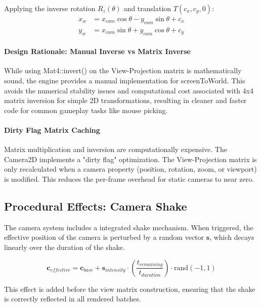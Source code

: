 Applying the inverse rotation $R_z(\theta)$ and translation $T(c_x, c_y, 0)$:
\begin{align}
x_w &= x_{cam} \cos \theta - y_{cam} \sin \theta + c_x \\
y_w &= x_{cam} \sin \theta + y_{cam} \cos \theta + c_y
\end{align}


\paragraph{Design Rationale: Manual Inverse vs Matrix Inverse}

While using Mat4::invert() on the View-Projection matrix is mathematically sound, the engine provides a manual implementation for screenToWorld. This avoids the numerical stability issues and computational cost associated with 4x4 matrix inversion for simple 2D transformations, resulting in cleaner and faster code for common gameplay tasks like mouse picking.




\paragraph{Dirty Flag Matrix Caching}

Matrix multiplication and inversion are computationally expensive. The Camera2D implements a "dirty flag" optimization. The View-Projection matrix is only recalculated when a camera property (position, rotation, zoom, or viewport) is modified. This reduces the per-frame overhead for static cameras to near zero.



\subsection{Procedural Effects: Camera Shake}

The camera system includes a integrated shake mechanism. When triggered, the effective position of the camera is perturbed by a random vector $\mathbf{s}$, which decays linearly over the duration of the shake.

\begin{equation}
\mathbf{c}_{effective} = \mathbf{c}_{base} + \mathbf{s}_{intensity} \cdot \left(\frac{t_{remaining}}{t_{duration}}\right) \cdot \text{rand}(-1, 1)
\end{equation}

This effect is added before the view matrix construction, ensuring that the shake is correctly reflected in all rendered batches.

